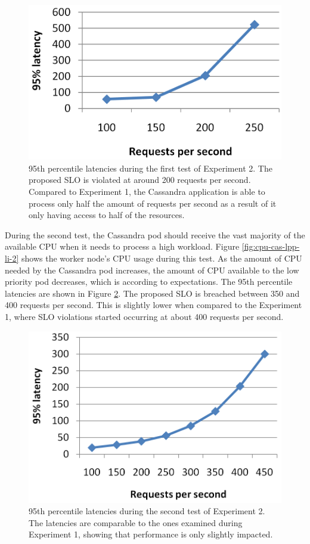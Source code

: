 \begin{figure}
\centering
\includegraphics[width=0.50\columnwidth]{Images/Experiments/CPU/Latencies/lat-cas-lpp-li.PNG}
\caption{95th percentile latencies during the first test of Experiment 2. The proposed SLO is violated at around 200 requests per second. Compared to Experiment 1, the Cassandra application is able to process only half the amount of requests per second as a result of it only having access to half of the resources.}
\label{fig:lat-cas-lpp-li}
\end{figure}

During the second test, the Cassandra pod should receive the vast majority of the available CPU when it needs to process a high workload. Figure \ref{fig:cpu-cas-lpp-li-2} shows the worker node's CPU usage during this test. As the amount of CPU needed by the Cassandra pod increases, the amount of CPU available to the low priority pod decreases, which is according to expectations. The 95th percentile latencies are shown in Figure \ref{fig:lat-cas-lpp-li-2}. The proposed SLO is breached between 350 and 400 requests per second. This is slightly lower when compared to the Experiment 1, where SLO violations started occurring at about 400 requests per second.

\begin{figure}
\centering
\includegraphics[width=0.50\columnwidth]{Images/Experiments/CPU/Latencies/lat-cas-lpp-li-2.PNG}
\caption{95th percentile latencies during the second test of Experiment 2. The latencies are comparable to the ones examined during Experiment 1, showing that performance is only slightly impacted.}
\label{fig:lat-cas-lpp-li-2}
\end{figure}

